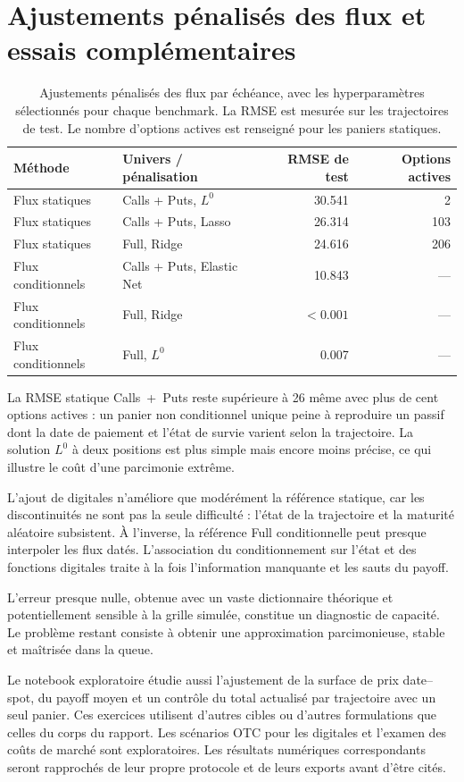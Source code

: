 
\section{Ajustements pénalisés des flux et essais complémentaires}\label{app:capacity-supplement}

\begin{table}[htbp]
\centering
\small
\begin{tabular}{llrr}
\toprule
Méthode & Univers / pénalisation & RMSE de test & Options actives \\
\midrule
Flux statiques & Calls + Puts, $L^0$ & 30.541 & 2 \\
Flux statiques & Calls + Puts, Lasso & 26.314 & 103 \\
Flux statiques & Full, Ridge & 24.616 & 206 \\
Flux conditionnels & Calls + Puts, Elastic Net & 10.843 & --- \\
Flux conditionnels & Full, Ridge & $<0.001$ & --- \\
Flux conditionnels & Full, $L^0$ & 0.007 & --- \\
\bottomrule
\end{tabular}
\caption{Ajustements pénalisés des flux par échéance, avec les hyperparamètres sélectionnés pour chaque benchmark. La RMSE est mesurée sur les trajectoires de test. Le nombre d'options actives est renseigné pour les paniers statiques.}
\label{tab:capacity}
\end{table}

La RMSE statique Calls~+~Puts reste supérieure à 26 même avec plus de cent options actives : un panier non conditionnel unique peine à reproduire un passif dont la date de paiement et l'état de survie varient selon la trajectoire. La solution $L^0$ à deux positions est plus simple mais encore moins précise, ce qui illustre le coût d'une parcimonie extrême.

L'ajout de digitales n'améliore que modérément la référence statique, car les discontinuités ne sont pas la seule difficulté : l'état de la trajectoire et la maturité aléatoire subsistent. À l'inverse, la référence Full conditionnelle peut presque interpoler les flux datés. L'association du conditionnement sur l'état et des fonctions digitales traite à la fois l'information manquante et les sauts du payoff.

L'erreur presque nulle, obtenue avec un vaste dictionnaire théorique et potentiellement sensible à la grille simulée, constitue un diagnostic de capacité. Le problème restant consiste à obtenir une approximation parcimonieuse, stable et maîtrisée dans la queue.

Le notebook exploratoire étudie aussi l'ajustement de la surface de prix date--spot, du payoff moyen et un contrôle du total actualisé par trajectoire avec un seul panier. Ces exercices utilisent d'autres cibles ou d'autres formulations que celles du corps du rapport. Les scénarios OTC pour les digitales et l'examen des coûts de marché sont exploratoires. Les résultats numériques correspondants seront rapprochés de leur propre protocole et de leurs exports avant d'être cités.
